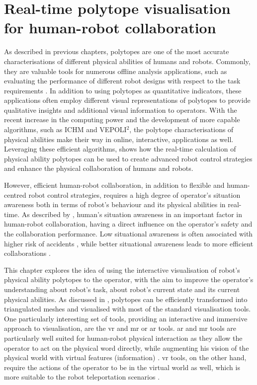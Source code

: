 


\chapter{Real-time polytope visualisation for human-robot collaboration}%
\label{ch:informaiton_polytopes}

As described in previous chapters, polytopes are one of the most accurate characterisations of different physical abilities of humans and robots. 
Commonly, they are valuable tools for numerous offline analysis applications, such as evaluating the performance of different robot designs with respect to the task requirements \cite{Finotello1998,Ghazaly2016,Rasheed2018,Muralidharan2022}. In addition to using polytopes as quantitative indicators, these applications often employ different visual representations of polytopes to provide qualitative insights and additional visual information to operators. 
With the recent increase in the computing power and the development of more capable algorithms, such as ICHM and VEPOLI$^2$, the polytope characterisations of physical abilities make their way in online, interactive, applications as well. Leveraging these efficient algorithms,  shows how the real-time calculation of physical ability polytopes can be used to create advanced robot control strategies and enhance the physical collaboration of humans and robots. 

However, efficient human-robot collaboration, in addition to flexible and human-centred robot control strategies, requires a high degree of operator’s situation awareness \cite{Endsley1995sa} both in terms of robot’s behaviour and its physical abilities in real-time. As described by \citet{Camblor2022Signaling}, human's situation awareness in an important factor in human-robot collaboration, having a direct influence on the operator's safety and the collaboration performance. Low situational awareness is often associated with higher risk of accidents \cite{Camblor2022Degraded}, while better situational awareness leads to more efficient collaborations \cite{Camblor2022Signaling}. 

This chapter explores the idea of using the interactive visualisation of robot's physical ability polytopes to the operator, with the aim to improve the operator's understanding about robot's task, about robot's current state and its current physical abilities.
As discussed in , polytopes can be efficiently transformed into triangulated meshes and visualised with most of the standard visualisation tools. One particularly interesting set of tools, providing an interactive and immersive approach to visualisation, are the \gls{vr} and \gls{mr} or \gls{ar} tools. \gls{ar} and \gls{mr} tools are particularly well suited for human-robot physical interaction as they allow the operator to act on the physical word directly, while augmenting his vision of the physical world with virtual features (information) \cite{Suzuki2022ARSurvey}. \gls{vr} tools, on the other hand, require the actions of the operator to be in the virtual world as well, which is more suitable to the robot teleportation scenarios \cite{Merwe2019VRTeleop}. 

